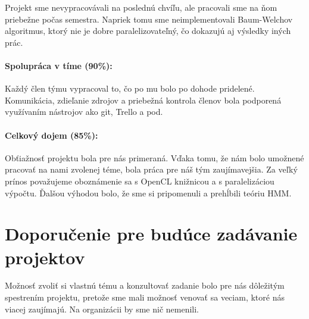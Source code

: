 \documentclass[11pt,a4paper]{article}
\begin{document}
Projekt sme nevypracovávali na poslednú chvíľu, ale pracovali sme na ňom priebežne počas semestra. Napriek tomu sme neimplementovali Baum-Welchov algoritmus, ktorý nie je dobre paralelizovateľný, čo dokazujú aj výsledky
iných prác.


\paragraph{Spolupráca v tíme (90\%):}

Každý člen týmu vypracoval to, čo po mu bolo po dohode pridelené. Komunikácia, zdieľanie zdrojov a priebežná kontrola členov bola podporená využívaním nástrojov ako git, Trello a pod.


\paragraph{Celkový dojem (85\%):}

Obťiažnosť projektu bola pre nás primeraná. Vďaka tomu, že nám bolo umožnené pracovať na nami zvolenej téme, bola práca pre náš tým zaujímavejšia. Za veľký prínos považujeme oboznámenie sa s OpenCL knižnicou a s paralelizáciou výpočtu. Ďalšou výhodou bolo, že sme si pripomenuli a prehĺbili teóriu HMM.


\section{Doporučenie pre budúce zadávanie projektov}

Možnosť zvoliť si vlastnú tému a konzultovať zadanie bolo pre nás dôležitým spestrením projektu, pretože sme mali možnosť venovať sa veciam, ktoré nás viacej zaujímajú. Na organizácii by sme nič nemenili.







\end{document}
